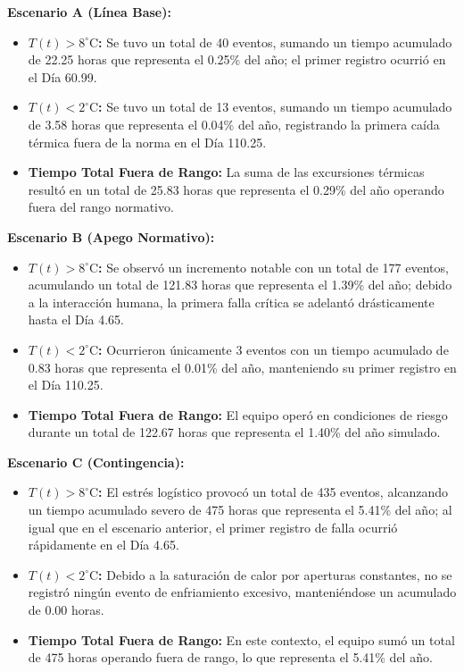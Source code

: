 \documentclass[
  spanish,
  us-letterpaper,
]{scrreprt}
\providecommand{\tightlist}{%
  \setlength{\itemsep}{0pt}\setlength{\parskip}{0pt}}
\numberwithin{equation}{section}
\theoremstyle{plain}
\theoremstyle{plain}
\theoremstyle{plain}
\theoremstyle{definition}
\theoremstyle{remark}
\begin{document}
\textbf{Escenario A (Línea Base):}

\begin{itemize}
\tightlist
\item
  \textbf{\(T(t)>8^\circ\text{C}\):} Se tuvo un total de 40 eventos,
  sumando un tiempo acumulado de 22.25 horas que representa el 0.25\%
  del año; el primer registro ocurrió en el Día 60.99.
\item
  \textbf{\(T(t)<2^\circ\text{C}\):} Se tuvo un total de 13 eventos,
  sumando un tiempo acumulado de 3.58 horas que representa el 0.04\% del
  año, registrando la primera caída térmica fuera de la norma en el Día
  110.25.
\item
  \textbf{Tiempo Total Fuera de Rango:} La suma de las excursiones
  térmicas resultó en un total de 25.83 horas que representa el 0.29\%
  del año operando fuera del rango normativo.
\end{itemize}

\textbf{Escenario B (Apego Normativo):}

\begin{itemize}
\tightlist
\item
  \textbf{\(T(t)>8^\circ\text{C}\):} Se observó un incremento notable
  con un total de 177 eventos, acumulando un total de 121.83 horas que
  representa el 1.39\% del año; debido a la interacción humana, la
  primera falla crítica se adelantó drásticamente hasta el Día 4.65.
\item
  \textbf{\(T(t)<2^\circ\text{C}\):} Ocurrieron únicamente 3 eventos con
  un tiempo acumulado de 0.83 horas que representa el 0.01\% del año,
  manteniendo su primer registro en el Día 110.25.
\item
  \textbf{Tiempo Total Fuera de Rango:} El equipo operó en condiciones
  de riesgo durante un total de 122.67 horas que representa el 1.40\%
  del año simulado.
\end{itemize}

\textbf{Escenario C (Contingencia):}

\begin{itemize}
\tightlist
\item
  \textbf{\(T(t)>8^\circ\text{C}\):} El estrés logístico provocó un
  total de 435 eventos, alcanzando un tiempo acumulado severo de 475
  horas que representa el 5.41\% del año; al igual que en el escenario
  anterior, el primer registro de falla ocurrió rápidamente en el Día
  4.65.
\item
  \textbf{\(T(t)<2^\circ\text{C}\):} Debido a la saturación de calor por
  aperturas constantes, no se registró ningún evento de enfriamiento
  excesivo, manteniéndose un acumulado de 0.00 horas.
\item
  \textbf{Tiempo Total Fuera de Rango:} En este contexto, el equipo sumó
  un total de 475 horas operando fuera de rango, lo que representa el
  5.41\% del año.
\end{itemize}
\end{document}
